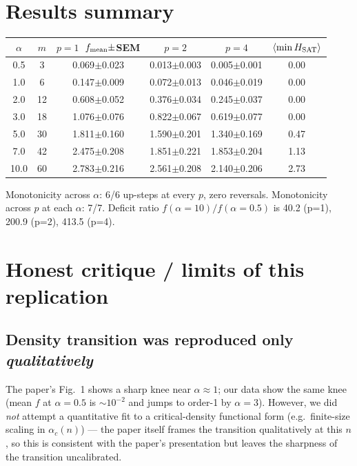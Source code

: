 \documentclass[11pt]{article}
\begin{document}
\section{Results summary}
\begin{center}\small
\begin{tabular}{cccccc}
\toprule
\(\alpha\) & \(m\) & \(p{=}1\)~\(f_{\rm mean}\pm\)SEM & \(p{=}2\) & \(p{=}4\) & \(\langle\min H_{\rm SAT}\rangle\)\\
\midrule
0.5 & 3  & 0.069\(\pm\)0.023 & 0.013\(\pm\)0.003 & 0.005\(\pm\)0.001 & 0.00\\
1.0 & 6  & 0.147\(\pm\)0.009 & 0.072\(\pm\)0.013 & 0.046\(\pm\)0.019 & 0.00\\
2.0 & 12 & 0.608\(\pm\)0.052 & 0.376\(\pm\)0.034 & 0.245\(\pm\)0.037 & 0.00\\
3.0 & 18 & 1.076\(\pm\)0.076 & 0.822\(\pm\)0.067 & 0.619\(\pm\)0.077 & 0.00\\
5.0 & 30 & 1.811\(\pm\)0.160 & 1.590\(\pm\)0.201 & 1.340\(\pm\)0.169 & 0.47\\
7.0 & 42 & 2.475\(\pm\)0.208 & 1.851\(\pm\)0.221 & 1.853\(\pm\)0.204 & 1.13\\
10.0& 60 & 2.783\(\pm\)0.216 & 2.561\(\pm\)0.208 & 2.140\(\pm\)0.206 & 2.73\\
\bottomrule
\end{tabular}
\end{center}
Monotonicity across \(\alpha\): 6/6 up-steps at every \(p\), zero
reversals. Monotonicity across \(p\) at each \(\alpha\): 7/7.
Deficit ratio \(f(\alpha{=}10)/f(\alpha{=}0.5)\) is 40.2 (p=1),
200.9 (p=2), 413.5 (p=4).

\section{Honest critique / limits of this replication}

\subsection{Density transition was reproduced only \emph{qualitatively}}
The paper's Fig.~1 shows a sharp knee near \(\alpha\approx 1\); our
data show the same knee (mean \(f\) at \(\alpha=0.5\) is \(\sim 10^{-2}\)
and jumps to order-1 by \(\alpha=3\)). However, we did \emph{not}
attempt a quantitative fit to a critical-density functional form
(e.g.\ finite-size scaling in \(\alpha_c(n)\)) --- the paper itself
frames the transition qualitatively at this \(n\), so this is
consistent with the paper's presentation but leaves the sharpness
of the transition uncalibrated.
\end{document}
